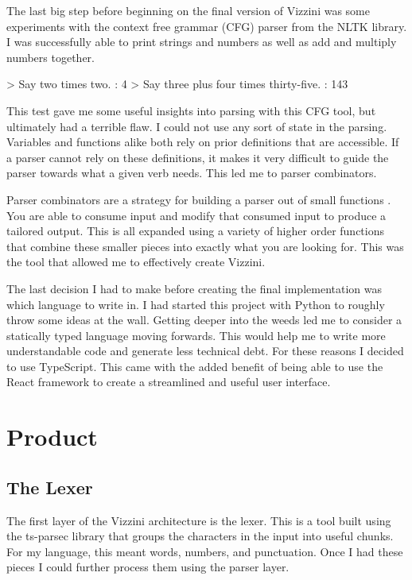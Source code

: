 \documentclass[titlepage]{article}
\newcommand{\langName}{Vizzini}
\begin{document}
The last big step before beginning on the final version of \langName{} was some experiments with the context free grammar (CFG) parser from the NLTK library. I was successfully able to print strings and numbers as well as add and multiply numbers together.

\begin{codeblock}[caption={Initial CFG Sample},label={lst:CFGsample}]
> Say two times two.
: 4
> Say three plus four times thirty-five.
: 143
\end{codeblock}

This test gave me some useful insights into parsing with this CFG tool, but ultimately had a terrible flaw. I could not use any sort of state in the parsing. Variables and functions alike both rely on prior definitions that are accessible. If a parser cannot rely on these definitions, it makes it very difficult to guide the parser towards what a given verb needs. This led me to parser combinators.

Parser combinators are a strategy for building a parser out of small functions \cite{Hutton1996MonadicPC}. You are able to consume input and modify that consumed input to produce a tailored output. This is all expanded using a variety of higher order functions that combine these smaller pieces into exactly what you are looking for. This was the tool that allowed me to effectively create \langName{}.

The last decision I had to make before creating the final implementation was which language to write in. I had started this project with Python to roughly throw some ideas at the wall. Getting deeper into the weeds led me to consider a statically typed language moving forwards. This would help me to write more understandable code and generate less technical debt. For these reasons I decided to use TypeScript. This came with the added benefit of being able to use the React framework to create a streamlined and useful user interface. 

\section*{Product}
\subsection*{The Lexer}
The first layer of the \langName{} architecture is the lexer. This is a tool built using the ts-parsec library that groups the characters in the input into useful chunks. For my language, this meant words, numbers, and punctuation. Once I had these pieces I could further process them using the parser layer.
\end{document}
